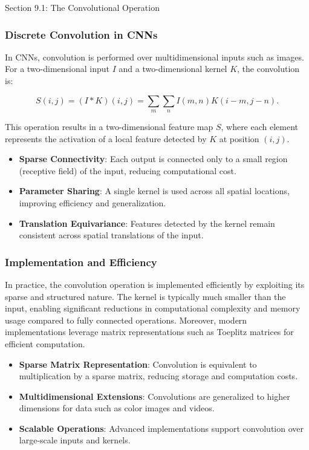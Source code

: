 \begin{notes}{Section 9.1: The Convolutional Operation}
    \subsubsection*{Discrete Convolution in CNNs}
    
    In CNNs, convolution is performed over multidimensional inputs such as images. For a two-dimensional input $I$ and a two-dimensional kernel $K$, the convolution is:
    
    \[
    S(i, j) = (I \ast K)(i, j) = \sum_{m} \sum_{n} I(m, n) K(i - m, j - n).
    \]
    
    This operation results in a two-dimensional feature map $S$, where each element represents the activation of a local feature detected by $K$ at position $(i, j)$.
    
    \begin{highlight}
        \begin{itemize}
            \item \textbf{Sparse Connectivity}: Each output is connected only to a small region (receptive field) of the input, reducing computational cost.
            \item \textbf{Parameter Sharing}: A single kernel is used across all spatial locations, improving efficiency and generalization.
            \item \textbf{Translation Equivariance}: Features detected by the kernel remain consistent across spatial translations of the input.
        \end{itemize}
    \end{highlight}
    
    \subsubsection*{Implementation and Efficiency}
    
    In practice, the convolution operation is implemented efficiently by exploiting its sparse and structured nature. The kernel is typically much smaller than the input, enabling significant reductions in 
    computational complexity and memory usage compared to fully connected operations. Moreover, modern implementations leverage matrix representations such as Toeplitz matrices for efficient computation.
    
    \begin{highlight}
        \begin{itemize}
            \item \textbf{Sparse Matrix Representation}: Convolution is equivalent to multiplication by a sparse matrix, reducing storage and computation costs.
            \item \textbf{Multidimensional Extensions}: Convolutions are generalized to higher dimensions for data such as color images and videos.
            \item \textbf{Scalable Operations}: Advanced implementations support convolution over large-scale inputs and kernels.
        \end{itemize}
    \end{highlight}
    

\end{notes}
